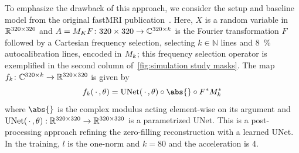 To emphasize the drawback of this approach, we consider the setup and baseline model from the original fastMRI publication~\cite{zbontar_fastmri_2018}.
Here, \( X \) is a random variable in \( \R^{\numproduct{320x320}} \) and \( \map{A = \Mask_{K}\Fourier}{\numproduct{320x320}}{\C^{\num{320}\times k}} \) is the Fourier transformation \( F \) followed by a Cartesian frequency selection, selecting \( k \in \mathbb{N} \) lines and \qty{8}{\percent} autocalibration lines, encoded in \( M_{k} \);
this frequency selection operator is exemplified in the second column of~\cref{fig:simulation study masks}.
The map \( \map{f_k}{\C^{\num{320}\times k}}{\R^{\numproduct{320x320}}} \) is given by
\begin{equation}
	f_k(\argm, \theta) = \mathrm{UNet}(\argm, \theta) \circ \abs{} \circ \Adjoint{\Fourier}\Adjoint{\Mask_{k}}
\end{equation}
where \( \abs{} \) is the complex modulus acting element-wise on its argument and \( \mathrm{UNet}(\argm, \theta) : \R^{\numproduct{320x320}} \to \R^{\numproduct{320x320}} \) is a parametrized UNet.
This is a post-processing approach refining the zero-filling reconstruction with a learned UNet.
In the training, \( l \) is the one-norm and  \( k = \num{80} \) and the acceleration is \num{4}.

